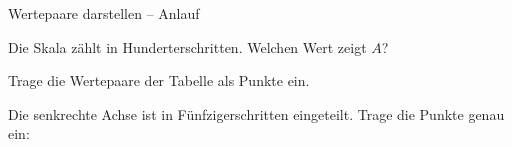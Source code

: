 \begin{aufgabe}{Wertepaare darstellen – Anlauf}
\begin{teile}
\teil Die Skala zählt in Hunderterschritten. Welchen Wert zeigt $A$?

\leerfeld
\teil Trage die Wertepaare der Tabelle als Punkte ein. 

\begin{ksys}[xmin=0,xmax=5,ymin=0,ymax=250,xstep=1,ystep=25,xlabel=t,ylabel=Anzahl]  \end{ksys}
\teil Die senkrechte Achse ist in Fünfzigerschritten eingeteilt. Trage die Punkte genau ein: 

\begin{ksys}[xmin=0,xmax=4,ymin=0,ymax=250,xstep=1,ystep=50,xlabel=t,ylabel=Wert]  \end{ksys}
\end{teile}
\end{aufgabe}

